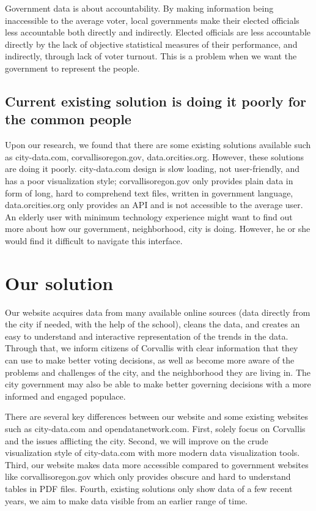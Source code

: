 \documentclass[12pt]{article}
\begin{document}
 

Government data is about accountability. By making information being inaccessible to the average voter, local governments make their elected officials less accountable both directly and indirectly. Elected officials are less accountable directly by the lack of objective statistical measures of their performance, and indirectly, through lack of voter turnout. This is a problem when we want the government to represent the people.

 

\subsection{Current existing solution is doing it poorly for the common people}

 

Upon our research, we found that there are some existing solutions available such as city-data.com, corvallisoregon.gov, data.orcities.org. However, these solutions are doing it poorly. city-data.com design is slow loading, not user-friendly, and has a poor visualization style; corvallisoregon.gov only provides plain data in form of long, hard to comprehend text files, written in government language, data.orcities.org only provides an API and is not accessible to the average user. An elderly user with minimum technology experience might want to find out more about how our government, neighborhood, city is doing. However, he or she would find it difficult to navigate this interface.

 

\section{Our solution}

 

Our website acquires data from many available online sources (data directly from the city if needed, with the help of the school), cleans the data, and creates an easy to understand and interactive representation of the trends in the data. Through that, we inform citizens of Corvallis with clear information that they can use to make better voting decisions, as well as become more aware of the problems and challenges of the city, and the neighborhood they are living in. The city government may also be able to make better governing decisions with a more informed and engaged populace.

 

There are several key differences between our website and some existing websites such as city-data.com and opendatanetwork.com. First, solely focus on Corvallis and the issues afflicting the city. Second, we will improve on the crude visualization style of city-data.com with more modern data visualization tools. Third, our website makes data more accessible compared to government websites like corvallisoregon.gov which only provides obscure and hard to understand tables in PDF files. Fourth, existing solutions only show data of a few recent years, we aim to make data visible from an earlier range of time.
\end{document}
